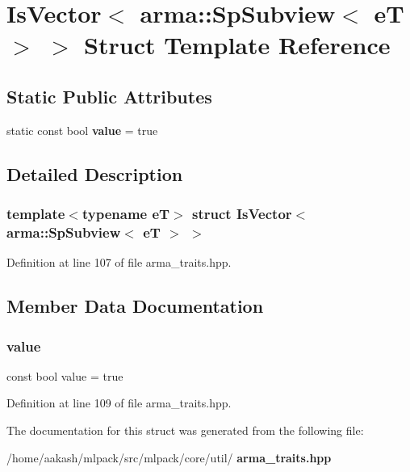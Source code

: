 \section{Is\+Vector$<$ arma\+:\+:Sp\+Subview$<$ eT $>$ $>$ Struct Template Reference}
\label{structIsVector_3_01arma_1_1SpSubview_3_01eT_01_4_01_4}
\subsection*{Static Public Attributes}
\begin{DoxyCompactItemize}
\item 
static const bool \textbf{ value} = true
\end{DoxyCompactItemize}


\subsection{Detailed Description}
\subsubsection*{template$<$typename eT$>$\newline
struct Is\+Vector$<$ arma\+::\+Sp\+Subview$<$ e\+T $>$ $>$}



Definition at line 107 of file arma\+\_\+traits.\+hpp.



\subsection{Member Data Documentation}
\mbox{\label{structIsVector_3_01arma_1_1SpSubview_3_01eT_01_4_01_4_a11ddd051208250c32dc4985abcafa86d}} 
\subsubsection{value}
{\footnotesize\ttfamily const bool value = true\hspace{0.3cm}{\ttfamily [static]}}



Definition at line 109 of file arma\+\_\+traits.\+hpp.



The documentation for this struct was generated from the following file\+:\begin{DoxyCompactItemize}
\item 
/home/aakash/mlpack/src/mlpack/core/util/\textbf{ arma\+\_\+traits.\+hpp}\end{DoxyCompactItemize}
